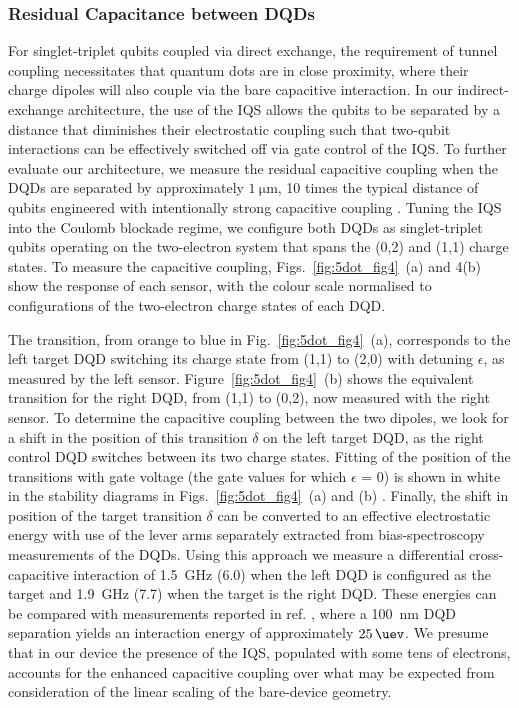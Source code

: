 \subsubsection{Residual Capacitance between DQDs}
For singlet-triplet qubits coupled via direct exchange, the requirement of tunnel coupling necessitates that quantum dots are in close proximity, where their charge dipoles will also couple via the bare capacitive interaction. In our indirect-exchange architecture, the use of the IQS allows the qubits to be separated by a distance that diminishes their electrostatic coupling such that two-qubit interactions can be effectively switched off via gate control of the IQS. To further evaluate our architecture, we measure the residual capacitive coupling when the DQDs are separated by approximately $\SI{1}{\micro\meter}$, 10 times the typical distance of qubits engineered with intentionally strong capacitive coupling \cite{weperen,Shulman202}. Tuning the IQS into the Coulomb blockade regime, we configure both DQDs as singlet-triplet qubits operating on the two-electron system that spans the (0,2) and (1,1) charge states. To measure the capacitive coupling, Figs.~\ref{fig:5dot_fig4}~(a) and 4(b) show the response of each sensor, with the colour scale normalised to configurations of the two-electron charge states of each DQD.

The transition, from orange to blue in Fig.~\ref{fig:5dot_fig4}~(a), corresponds to the left target DQD switching its charge state from (1,1) to (2,0) with detuning $\epsilon$, as measured by the left sensor. Figure~\ref{fig:5dot_fig4}~(b) shows the equivalent transition for the right DQD, from (1,1) to (0,2), now measured with the right sensor. To determine the capacitive coupling between the two dipoles, we look for a shift in the position of this transition $\delta$ on the left target DQD, as the right control DQD switches between its two charge states. Fitting of the position of the transitions with gate voltage (the gate values for which $\epsilon$ = 0) is shown in white in the stability diagrams in Figs.~\ref{fig:5dot_fig4}~(a) and (b) \cite{dicarlo}. Finally, the shift in position of the target transition $\delta$ can be converted to an effective electrostatic energy with use of the lever arms separately extracted from bias-spectroscopy measurements of the DQDs. Using this approach we measure a differential cross-capacitive interaction of \SI{1.5}{\giga\hertz} (\SI{6.0}{\uev})  when the left DQD is configured as the target and  \SI{1.9}{\giga\hertz} (\SI{7.7}{\uev}) when the target is the right DQD. These energies can be compared with measurements reported in ref. \cite{weperen}, where a \SI{100}{\nano\meter} DQD separation yields an interaction energy of approximately $\SI{25}{\uev}$.  We presume that in our device the presence of the IQS, populated with some tens of electrons, accounts for the enhanced capacitive coupling over what may be expected from consideration of the linear scaling of the bare-device geometry. 

